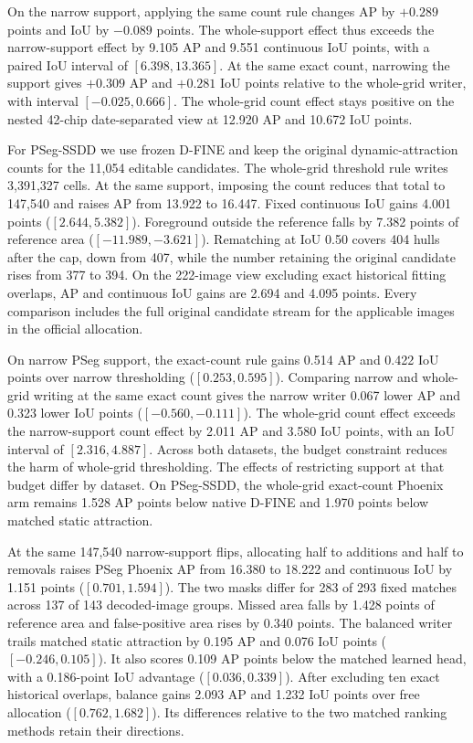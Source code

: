 \documentclass[journal]{IEEEtran}
\begin{document}
On the narrow support, applying the same count rule changes AP by \(+0.289\) points and IoU by \(-0.089\) points. The whole-support effect thus exceeds the narrow-support effect by 9.105 AP and 9.551 continuous IoU points, with a paired IoU interval of \([6.398,13.365]\). At the same exact count, narrowing the support gives \(+0.309\) AP and \(+0.281\) IoU points relative to the whole-grid writer, with interval \([-0.025,0.666]\). The whole-grid count effect stays positive on the nested 42-chip date-separated view at 12.920 AP and 10.672 IoU points.

For PSeg-SSDD we use frozen D-FINE and keep the original dynamic-attraction counts for the 11,054 editable candidates. The whole-grid threshold rule writes 3,391,327 cells. At the same support, imposing the count reduces that total to 147,540 and raises AP from 13.922 to 16.447. Fixed continuous IoU gains 4.001 points (\([2.644,5.382]\)). Foreground outside the reference falls by 7.382 points of reference area (\([-11.989,-3.621]\)). Rematching at IoU 0.50 covers 404 hulls after the cap, down from 407, while the number retaining the original candidate rises from 377 to 394. On the 222-image view excluding exact historical fitting overlaps, AP and continuous IoU gains are 2.694 and 4.095 points. Every comparison includes the full original candidate stream for the applicable images in the official allocation.

On narrow PSeg support, the exact-count rule gains 0.514 AP and 0.422 IoU points over narrow thresholding (\([0.253,0.595]\)). Comparing narrow and whole-grid writing at the same exact count gives the narrow writer 0.067 lower AP and 0.323 lower IoU points (\([-0.560,-0.111]\)). The whole-grid count effect exceeds the narrow-support count effect by 2.011 AP and 3.580 IoU points, with an IoU interval of \([2.316,4.887]\). Across both datasets, the budget constraint reduces the harm of whole-grid thresholding. The effects of restricting support at that budget differ by dataset. On PSeg-SSDD, the whole-grid exact-count Phoenix arm remains 1.528 AP points below native D-FINE and 1.970 points below matched static attraction.

At the same 147,540 narrow-support flips, allocating half to additions and half to removals raises PSeg Phoenix AP from 16.380 to 18.222 and continuous IoU by 1.151 points (\([0.701,1.594]\)). The two masks differ for 283 of 293 fixed matches across 137 of 143 decoded-image groups. Missed area falls by 1.428 points of reference area and false-positive area rises by 0.340 points. The balanced writer trails matched static attraction by 0.195 AP and 0.076 IoU points (\([-0.246,0.105]\)). It also scores 0.109 AP points below the matched learned head, with a 0.186-point IoU advantage (\([0.036,0.339]\)). After excluding ten exact historical overlaps, balance gains 2.093 AP and 1.232 IoU points over free allocation (\([0.762,1.682]\)). Its differences relative to the two matched ranking methods retain their directions.
\end{document}
